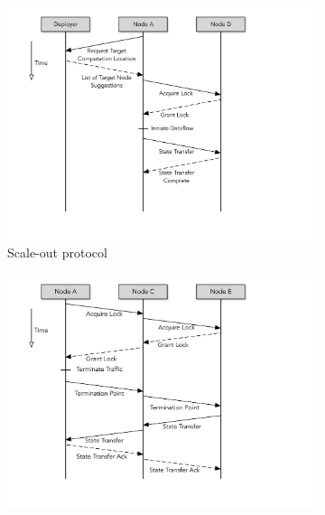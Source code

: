 \begin{figure}[h!]
        \begin{subfigure}{0.45\textwidth}
                \centering
                \includegraphics[scale=0.45, valign=t]{figures/scale-out.pdf}
                \caption{Scale-out protocol}
                \label{fig:scale-out-protocol}    
        \end{subfigure}
        \begin{subfigure}{0.45\textwidth}
                \centering
                \includegraphics[scale=0.45, valign=t]{figures/scale-in.pdf} 

\end{subfigure}
\end{figure}

